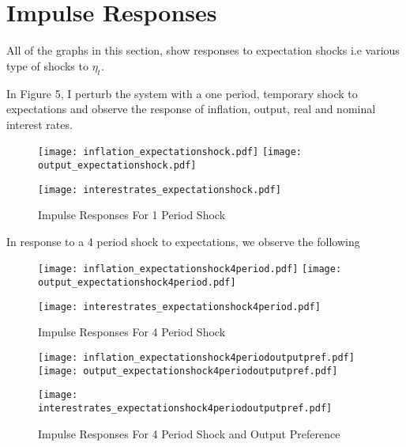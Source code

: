\documentclass[12pt]{article}
\newcommand{\1}{\mathbbm 1}
\begin{document}
		
		
	
		
		\section{Impulse Responses}
		
		
		
		
		
	All of the graphs in this section, show responses to expectation shocks i.e various type of shocks to $\eta_{t}$.
	
	In Figure 5, I perturb the system with a one period, temporary shock to expectations and observe the response of inflation, output, real and nominal interest rates. 
		
		
		
		
		
		
		\begin{figure}[H]
				\texttt{[image: inflation\_expectationshock.pdf]}
				\hfill
				\texttt{[image: output\_expectationshock.pdf]}
				\hfill
				\begin{Center}
				\texttt{[image: interestrates\_expectationshock.pdf]}
				\end{Center}
				\caption{Impulse Responses For 1 Period Shock}
		\end{figure}
	
	In response to a 4 period shock to expectations, we observe the following
		
		
			\begin{figure}[H]
			\texttt{[image: inflation\_expectationshock4period.pdf]}
			\hfill
			\texttt{[image: output\_expectationshock4period.pdf]}
			\hfill
			\begin{Center}
				\texttt{[image: interestrates\_expectationshock4period.pdf]}
			\end{Center}
			\caption{Impulse Responses For 4 Period Shock}
		\end{figure}
	
	
	\begin{figure}[H]
		\texttt{[image: inflation\_expectationshock4periodoutputpref.pdf]}
		\hfill
		\texttt{[image: output\_expectationshock4periodoutputpref.pdf]}
		\hfill
		\begin{Center}
			\texttt{[image: interestrates\_expectationshock4periodoutputpref.pdf]}
		\end{Center}
		\caption{Impulse Responses For 4 Period Shock and Output Preference}
	\end{figure}
\end{document}

